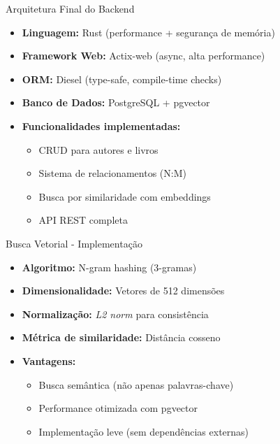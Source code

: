 \documentclass{beamer}
\begin{document}
\begin{frame}{Arquitetura Final do Backend}
\begin{itemize}
\item \textbf{Linguagem:} Rust (performance + segurança de memória)
\item \textbf{Framework Web:} Actix-web (async, alta performance)
\item \textbf{ORM:} Diesel (type-safe, compile-time checks)
\item \textbf{Banco de Dados:} PostgreSQL + pgvector
\item \textbf{Funcionalidades implementadas:}
    \begin{itemize}
    \item CRUD para autores e livros
    \item Sistema de relacionamentos (N:M)
    \item Busca por similaridade com embeddings
    \item API REST completa
    \end{itemize}
\end{itemize}
\end{frame}

\begin{frame}{Busca Vetorial - Implementação}
\begin{itemize}
\item \textbf{Algoritmo:} N-gram hashing (3-gramas)
\item \textbf{Dimensionalidade:} Vetores de 512 dimensões
\item \textbf{Normalização:} \textit{L2 norm} para consistência
\item \textbf{Métrica de similaridade:} Distância cosseno
\item \textbf{Vantagens:}
    \begin{itemize}
    \item Busca semântica (não apenas palavras-chave)
    \item Performance otimizada com pgvector
    \item Implementação leve (sem dependências externas)
    \end{itemize}
\end{itemize}
\end{frame}
\end{document}
